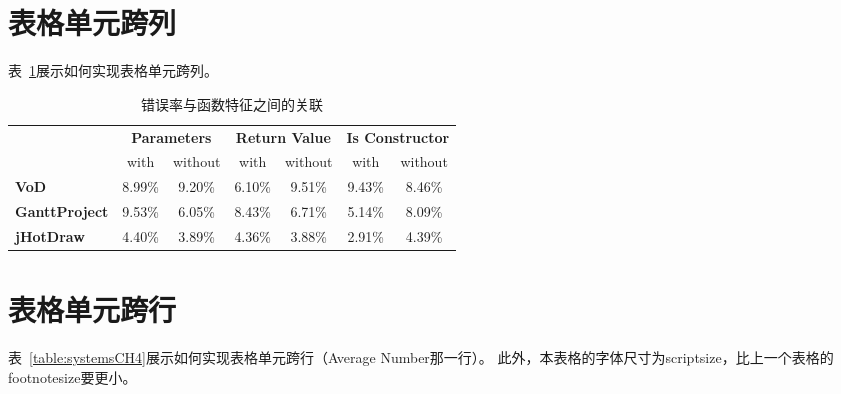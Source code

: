 \section{表格单元跨列}

表~\ref{table:codeSmellMethods}展示如何实现表格单元跨列。

\begin{table}[htb]\footnotesize
\centering
\caption{错误率与函数特征之间的关联}
\vspace{2mm}
\begin{tabular}{lcccccc}
\toprule
&\multicolumn{2}{c}{\textbf{Parameters}}
&\multicolumn{2}{c}{\textbf{Return Value}}
&\multicolumn{2}{c}{\textbf{Is Constructor}}\\
&with&without&with&without&with&without\\
\midrule
\textbf{VoD}&8.99\%&9.20\%&6.10\%&9.51\%&9.43\%&8.46\%\\
\textbf{GanttProject}&9.53\%&6.05\%&8.43\%&6.71\%&5.14\%&8.09\%\\
\textbf{jHotDraw}&4.40\%&3.89\%&4.36\%&3.88\%&2.91\%&4.39\%\\
\bottomrule
\end{tabular}
\label{table:codeSmellMethods}
\end{table}

\section{表格单元跨行}

表~\ref{table:systemsCH4}展示如何实现表格单元跨行（Average Number那一行）。
此外，本表格的字体尺寸为scriptsize，比上一个表格的footnotesize要更小。

